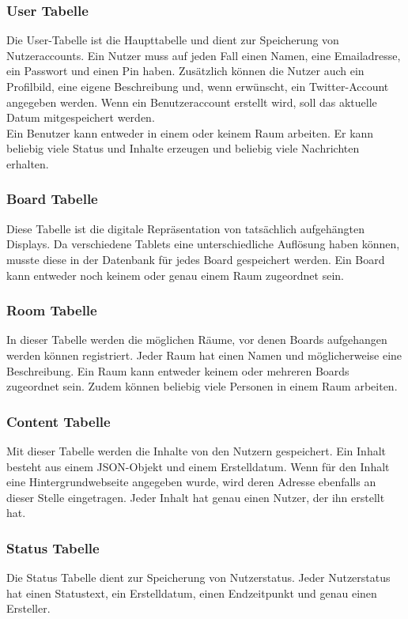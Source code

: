\subsubsection{User Tabelle}\label{User Tabelle}
Die User-Tabelle ist die Haupttabelle und dient zur Speicherung von Nutzeraccounts. Ein Nutzer muss auf jeden Fall einen Namen, eine Emailadresse, ein Passwort und einen Pin haben.
Zusätzlich können die Nutzer auch ein Profilbild, eine eigene Beschreibung und, wenn erwünscht, ein Twitter-Account angegeben werden.
Wenn ein Benutzeraccount erstellt wird, soll das aktuelle Datum mitgespeichert werden.
\\
Ein Benutzer kann entweder in einem oder keinem Raum arbeiten. Er kann beliebig viele Status und Inhalte erzeugen und beliebig viele Nachrichten erhalten.
\subsubsection{Board Tabelle}\label{Board Tabelle}
Diese Tabelle ist die digitale Repräsentation von tatsächlich aufgehängten Displays. Da verschiedene Tablets eine unterschiedliche Auflösung haben können, musste diese in der Datenbank für jedes Board gespeichert werden. Ein Board kann entweder noch keinem oder genau einem Raum zugeordnet sein.
\subsubsection{Room Tabelle}\label{Room Tabelle}
In dieser Tabelle werden die möglichen Räume, vor denen Boards aufgehangen werden können registriert. Jeder Raum hat einen Namen und möglicherweise eine Beschreibung. Ein Raum kann entweder keinem oder mehreren Boards zugeordnet sein. Zudem können beliebig viele Personen in einem Raum arbeiten.
\subsubsection{Content Tabelle}\label{Content Tabelle}
Mit dieser Tabelle werden die Inhalte von den Nutzern gespeichert. Ein Inhalt besteht aus einem JSON-Objekt und einem Erstelldatum. Wenn für den Inhalt eine Hintergrundwebseite angegeben wurde, wird deren Adresse ebenfalls an dieser Stelle eingetragen. Jeder Inhalt hat genau einen Nutzer, der ihn erstellt hat.
\subsubsection{Status Tabelle}\label{Status Tabelle}
Die Status Tabelle dient zur Speicherung von Nutzerstatus. Jeder Nutzerstatus hat einen Statustext, ein Erstelldatum, einen Endzeitpunkt und genau einen Ersteller. 
